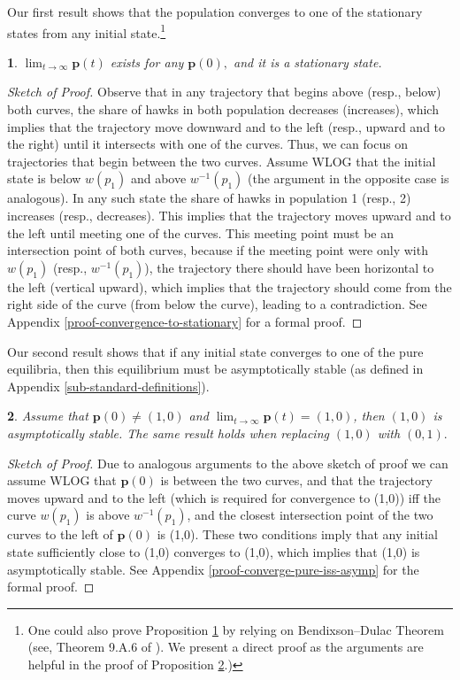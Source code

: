 \documentclass[12pt]{article}
\numberwithin{equation}{section}
\numberwithin{figure}{section}
\theoremstyle{definition}
\theoremstyle{plain}
\theoremstyle{plain}
\newtheorem{prop}{\protect\propositionname}
\theoremstyle{plain}
\theoremstyle{remark}
\theoremstyle{plain}
\theoremstyle{plain}
\providecommand{\propositionname}{Proposition}
\begin{document}
Our first result shows that the population converges to one of the stationary states from any initial state.\footnote{
One could also prove Proposition \ref{pro-convergence-to-stationary} by relying on Bendixson--Dulac Theorem (see, Theorem 9.A.6 of \citealp{sandholm2010population}). We present a direct proof as the arguments are helpful in the proof of Proposition \ref{pro-convergence-to-pure-iff-asymp}.)}
\begin{prop}\label{pro-convergence-to-stationary}
  $\lim_{t\rightarrow\infty}\mathbf{p}\left(t\right)$ exists for any $\textbf{p}(0),$ and it is a stationary state.
\end{prop}
\begin{proof}[Sketch of Proof]
Observe that in any trajectory that begins above (resp., below) both curves, the share of hawks in both population decreases (increases), which implies that the trajectory move downward and to the left (resp., upward and to the right) until it intersects with one of the curves. Thus, we can focus on trajectories that begin between the two curves. Assume WLOG that the initial state is below 
 $w(p_1)$ and above  $w^{-1}(p_1)$ (the argument in the opposite case is analogous). In any such state the share of hawks in population 1 (resp., 2) increases (resp., decreases). This implies that the trajectory moves upward and to the left until meeting one of the curves. This meeting point must be an intersection point of both curves, because if the meeting point were only with $w(p_1)$ (resp., $w^{-1}(p_1)$), the trajectory there should have been  horizontal to the left (vertical upward), which implies that the trajectory should come from the right side of the curve (from below the curve), leading to a contradiction.  See Appendix \ref{proof-convergence-to-stationary} for a formal proof.
\end{proof}
Our second result shows that if any initial state converges to one of the pure equilibria, then this equilibrium must be asymptotically stable (as defined in Appendix \ref{sub-standard-definitions}).
\begin{prop}\label{pro-convergence-to-pure-iff-asymp}
Assume that  $\textbf{p}(0)\neq (1,0)$ and $\lim_{t\rightarrow\infty}\mathbf{p}\left(t\right)=(1,0)$, then $(1,0)$ is asymptotically stable. The same result holds when replacing $(1,0)$ with $(0,1).$
\end{prop}
\begin{proof}[Sketch of Proof]
Due to analogous arguments to the above sketch of proof we can assume WLOG that $\textbf{p}(0)$ is between the two curves, and that the trajectory moves upward and to the left (which is required for convergence to (1,0)) iff the curve $w(p_1)$ is above $w^{-1}(p_1)$, and the closest intersection point of the two curves to the left of  $\textbf{p}(0)$ is (1,0). These two conditions imply that any initial state sufficiently close to (1,0) converges to (1,0), which implies that (1,0) is asymptotically stable.
See Appendix \ref{proof-converge-pure-iss-asymp} for the formal proof.
\end{proof}
\end{document}
